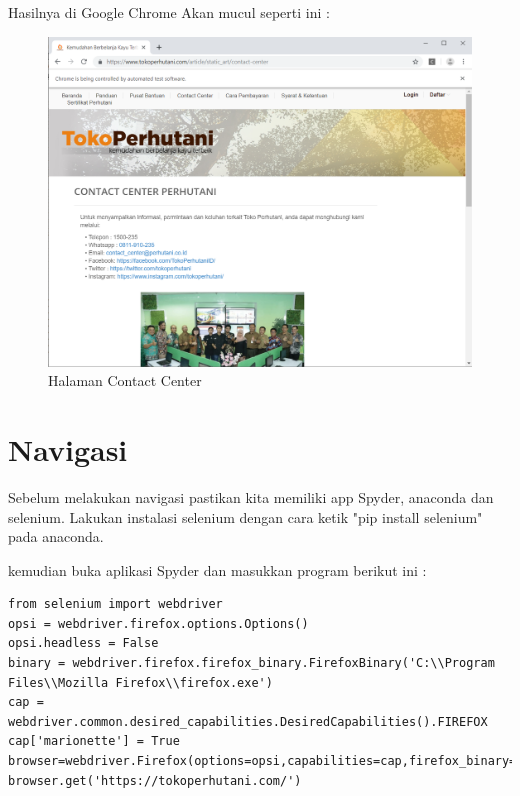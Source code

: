 Hasilnya  di Google Chrome Akan mucul seperti ini :
\begin{figure}[h]
	\centering
	\includegraphics[scale=0.3]{figures/4kontak.PNG}
	\caption{Halaman Contact Center}
\end{figure}

\section{Navigasi}
Sebelum melakukan navigasi pastikan kita memiliki app Spyder, anaconda dan selenium. Lakukan instalasi selenium dengan cara ketik "pip install selenium" pada anaconda.

kemudian buka aplikasi Spyder dan masukkan program berikut ini :
\begin{verbatim}
from selenium import webdriver
opsi = webdriver.firefox.options.Options()
opsi.headless = False
binary = webdriver.firefox.firefox_binary.FirefoxBinary('C:\\Program Files\\Mozilla Firefox\\firefox.exe')
cap = webdriver.common.desired_capabilities.DesiredCapabilities().FIREFOX
cap['marionette'] = True
browser=webdriver.Firefox(options=opsi,capabilities=cap,firefox_binary=binary)
browser.get('https://tokoperhutani.com/')
\end{verbatim}

